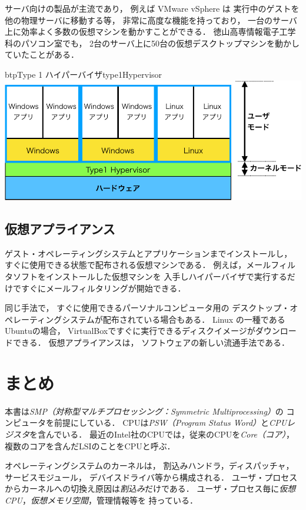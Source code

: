 サーバ向けの製品が主流であり，
例えば VMware vSphere は
実行中のゲストを他の物理サーバに移動する等，
非常に高度な機能を持っており\cite{vsphere}，
一台のサーバ上に効率よく多数の仮想マシンを動かすことができる．
徳山高専情報電子工学科のパソコン室でも，
2台のサーバ上に50台の仮想デスクトップマシンを動かしていたことがある．

\begin{myfig}{btp}{Type 1 ハイパーバイザ}{type1Hypervisor}
  \includegraphics[scale=0.66]{Fig/type1Hypervisor-crop.pdf}
\end{myfig}

\subsection{仮想アプライアンス}
ゲスト・オペレーティングシステムとアプリケーションまでインストールし，
すぐに使用できる状態で配布される仮想マシンである．
例えば，メールフィルタソフトをインストールした仮想マシンを
入手しハイパーバイザで実行するだけですぐにメールフィルタリングが開始できる．

同じ手法で，
すぐに使用できるパーソナルコンピュータ用の
デスクトップ・オペレーティングシステムが配布されている場合もある．
Linux の一種であるUbuntuの場合，
VirtualBoxですぐに実行できるディスクイメージがダウンロードできる\cite{ubuntu}．
仮想アプライアンスは，
ソフトウェアの新しい流通手法である．

\section{まとめ}
本書は\emph{SMP（対称型マルチプロセッシング：Symmetric Multiprocessing）}の
コンピュータを前提にしている．
CPUは\emph{PSW（Program Status Word）}と\emph{CPUレジスタ}を含んでいる．
最近のIntel社のCPUでは，従来のCPUを\emph{Core（コア）}，
複数のコアを含んだLSIのことをCPUと呼ぶ．

オペレーティングシステムのカーネルは，
割込みハンドラ，ディスパッチャ，サービスモジュール，
デバイスドライバ等から構成される．
ユーザ・プロセスからカーネルへの切換え原因は\emph{割込み}だけである．
ユーザ・プロセス毎に\emph{仮想CPU}，\emph{仮想メモリ空間}，管理情報等を
持っている．

